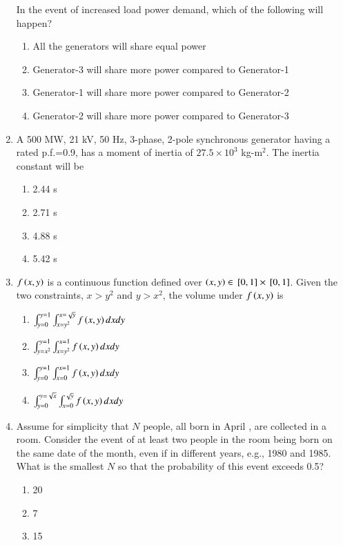\documentclass[journal]{IEEEtran}
\numberwithin{equation}{enumi}
\numberwithin{figure}{enumi}
\begin{document}
\begin{enumerate}[start=25]
In the event of increased load power demand, which of the following will happen?
\begin{enumerate}
\item All the generators will share equal power
\item Generator-3 will share more power compared to Generator-1
\item Generator-1 will share more power compared to Generator-2
\item Generator-2 will share more power compared to Generator-3
\end{enumerate}
    \item A 500 MW, 21 kV, 50 Hz, 3-phase, 2-pole synchronous generator having a rated p.f.=0.9, has a moment of inertia of $27.5 \times 10^3$ kg-m$^2$. The inertia constant  will be
    \begin{enumerate}
        \item 2.44 s
        \item 2.71 s
        \item 4.88 s
        \item 5.42 s
    \end{enumerate}
    \item $f\left(x, y\right)$ is a continuous function defined over $\left(x, y\right) \in {}\left[0,1\right] \times {}\left[0,1\right]$. Given the two constraints, $x > y^2$ and $y > x^2$, the volume under $f\left(x, y\right)$ is
    \begin{enumerate}
        \item $\int_{y=0}^{y=1} \int_{x=y^2}^{x=\sqrt{y}} f\left(x,y\right) dx dy$
        \item $\int_{y=x^2}^{y=1} \int_{x=y^2}^{x=1} f\left(x,y\right) dx dy$
        \item $\int_{y=0}^{y=1} \int_{x=0}^{x=1} f\left(x,y\right) dx dy$
        \item $\int_{y=0}^{y=\sqrt{x}} \int_{x=0}^{\sqrt{y}} f\left(x,y\right) dx dy$
    \end{enumerate}
    \item Assume for simplicity that $N$ people, all born in April , are collected in a room. Consider the event of at least two people in the room being born on the same date of the month, even if in different years, e.g., 1980 and 1985. What is the smallest $N$ so that the probability of this event exceeds 0.5?
    \begin{enumerate}
        \item 20
        \item 7
        \item 15

\end{enumerate}
\end{enumerate}
\end{document}
